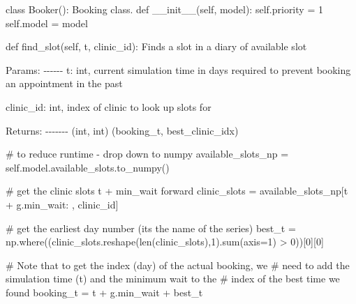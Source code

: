 \documentclass[
  letterpaper,
  DIV=11,
  numbers=noendperiod]{scrreprt}
\newenvironment{Shaded}{\begin{snugshade}}{\end{snugshade}}
\newcommand{\BuiltInTok}[1]{\textcolor[rgb]{0.00,0.23,0.31}{#1}}
\newcommand{\CommentTok}[1]{\textcolor[rgb]{0.37,0.37,0.37}{#1}}
\newcommand{\DecValTok}[1]{\textcolor[rgb]{0.68,0.00,0.00}{#1}}
\newcommand{\FunctionTok}[1]{\textcolor[rgb]{0.28,0.35,0.67}{#1}}
\newcommand{\KeywordTok}[1]{\textcolor[rgb]{0.00,0.23,0.31}{#1}}
\newcommand{\NormalTok}[1]{\textcolor[rgb]{0.00,0.23,0.31}{#1}}
\newcommand{\OperatorTok}[1]{\textcolor[rgb]{0.37,0.37,0.37}{#1}}
\newcommand{\VariableTok}[1]{\textcolor[rgb]{0.07,0.07,0.07}{#1}}
\begin{document}
\begin{Shaded}
\begin{Highlighting}[]
\KeywordTok{class}\NormalTok{ Booker():}
    \CommentTok{\textquotesingle{}\textquotesingle{}\textquotesingle{}}
\CommentTok{    Booking class.}
\CommentTok{    \textquotesingle{}\textquotesingle{}\textquotesingle{}}
    \KeywordTok{def} \FunctionTok{\_\_init\_\_}\NormalTok{(}\VariableTok{self}\NormalTok{, model):}
        \VariableTok{self}\NormalTok{.priority }\OperatorTok{=} \DecValTok{1}
        \VariableTok{self}\NormalTok{.model }\OperatorTok{=}\NormalTok{ model}

    \KeywordTok{def}\NormalTok{ find\_slot(}\VariableTok{self}\NormalTok{, t, clinic\_id):}
        \CommentTok{\textquotesingle{}\textquotesingle{}\textquotesingle{}}
\CommentTok{        Finds a slot in a diary of available slot}

\CommentTok{        Params:}
\CommentTok{        {-}{-}{-}{-}{-}{-}}
\CommentTok{        t: int,}
\CommentTok{            current simulation time in days}
\CommentTok{            required to prevent booking an appointment}
\CommentTok{            in the past}

\CommentTok{        clinic\_id: int,}
\CommentTok{            index of clinic to look up slots for}

\CommentTok{        Returns:}
\CommentTok{        {-}{-}{-}{-}{-}{-}{-}}
\CommentTok{        (int, int)}
\CommentTok{        (booking\_t, best\_clinic\_idx)}

\CommentTok{        \textquotesingle{}\textquotesingle{}\textquotesingle{}}
        \CommentTok{\# to reduce runtime {-} drop down to numpy}
\NormalTok{        available\_slots\_np }\OperatorTok{=} \VariableTok{self}\NormalTok{.model.available\_slots.to\_numpy()}

        \CommentTok{\# get the clinic slots t + min\_wait forward}
\NormalTok{        clinic\_slots }\OperatorTok{=}\NormalTok{ available\_slots\_np[t }\OperatorTok{+}\NormalTok{ g.min\_wait: , clinic\_id]}

        \CommentTok{\# get the earliest day number (its the name of the series)}
\NormalTok{        best\_t }\OperatorTok{=}\NormalTok{ np.where((clinic\_slots.reshape(}\BuiltInTok{len}\NormalTok{(clinic\_slots),}\DecValTok{1}\NormalTok{).}\BuiltInTok{sum}\NormalTok{(axis}\OperatorTok{=}\DecValTok{1}\NormalTok{) }\OperatorTok{\textgreater{}} \DecValTok{0}\NormalTok{))[}\DecValTok{0}\NormalTok{][}\DecValTok{0}\NormalTok{]}

        \CommentTok{\# Note that to get the index (day) of the actual booking, we}
        \CommentTok{\# need to add the simulation time (t) and the minimum wait to the}
        \CommentTok{\# index of the best time we found}
\NormalTok{        booking\_t }\OperatorTok{=}\NormalTok{ t }\OperatorTok{+}\NormalTok{ g.min\_wait }\OperatorTok{+}\NormalTok{ best\_t}


\end{Highlighting}
\end{Shaded}
\end{document}
